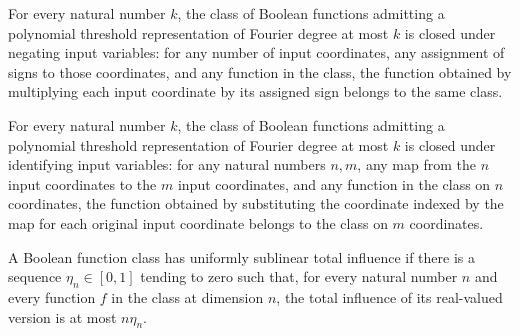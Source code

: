 \begin{theorem}
\label{FABL.polynomialThresholdClass_closedUnderNegatingInputVariables}
\leanok
{}
For every natural number $k$, the class of Boolean functions admitting a polynomial
threshold representation of Fourier degree at most $k$ is closed under negating input
variables: for any number of input coordinates, any assignment of signs to those
coordinates, and any function in the class, the function obtained by multiplying each
input coordinate by its assigned sign belongs to the same class.
\end{theorem}

\begin{theorem}
\label{FABL.polynomialThresholdClass_closedUnderIdentifyingInputVariables}
\leanok
{}
For every natural number $k$, the class of Boolean functions admitting a polynomial
threshold representation of Fourier degree at most $k$ is closed under identifying input
variables: for any natural numbers $n,m$, any map from the $n$ input coordinates to the
$m$ input coordinates, and any function in the class on $n$ coordinates, the function
obtained by substituting the coordinate indexed by the map for each original input
coordinate belongs to the class on $m$ coordinates.
\end{theorem}

\begin{definition}
\label{FABL.HasUniformlySublinearTotalInfluence}
\leanok
{}
A Boolean function class has uniformly sublinear total influence if there is a sequence
$\eta_n\in[0,1]$ tending to zero such that, for every natural number $n$ and every
function $f$ in the class at dimension $n$, the total influence of its real-valued
version is at most $n\eta_n$.
\end{definition}

